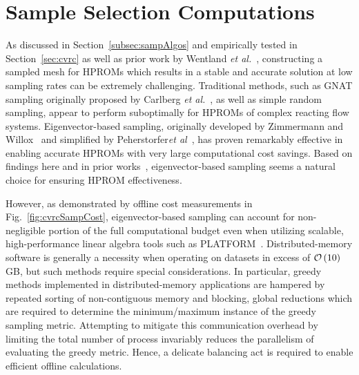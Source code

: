 \section{Sample Selection Computations}

As discussed in Section~\ref{subsec:sampAlgos} and empirically tested in Section~\ref{sec:cvrc} as well as prior work by Wentland \textit{et al.}~\cite{Wentland2021}, constructing a sampled mesh for HPROMs which results in a stable and accurate solution at low sampling rates can be extremely challenging. Traditional methods, such as GNAT sampling originally proposed by Carlberg \textit{et al.}~\cite{Carlberg2013}, as well as simple random sampling, appear to perform suboptimally for HPROMs of complex reacting flow systems. Eigenvector-based sampling, originally developed by Zimmermann and Willox~\cite{Zimmermann2016} and simplified by Peherstorfer\textit{et al}~\cite{Peherstorfer2020}, has proven remarkably effective in enabling accurate HPROMs with very large computational cost savings. Based on findings here and in prior works~\cite{Peherstorfer2020,Wentland2021}, eigenvector-based sampling seems a natural choice for ensuring HPROM effectiveness. 

However, as demonstrated by offline cost measurements in Fig.~\ref{fig:cvrcSampCost}, eigenvector-based sampling can account for non-negligible portion of the full computational budget even when utilizing scalable, high-performance linear algebra tools such as PLATFORM~\cite{ArnoldMedabalimi2022}. Distributed-memory software is generally a necessity when operating on datasets in excess of $\mathcal{O}\left(10\right)$ GB, but such methods require special considerations. In particular, greedy methods implemented in distributed-memory applications are hampered by repeated sorting of non-contiguous memory and blocking, global reductions which are required to determine the minimum/maximum instance of the greedy sampling metric. Attempting to mitigate this communication overhead by limiting the total number of process invariably reduces the parallelism of evaluating the greedy metric. Hence, a delicate balancing act is required to enable efficient offline calculations.

